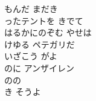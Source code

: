 \documentclass[10pt,b5j]{tarticle} %
\begin{document}
\begin{enumerate}
\begin{minipage}[c]{\blocksize}
        \vspace{\linespace}
        \item
        もんだ まだき\\
        ったテントを きでて\\
        はるかにのぞむ やせは\\
        けゆる ペテガリだ\\
        いざこう がよ\\
        のに アンザイレン\\
        のの\\
        き そうよ
    
    \end{minipage}
\end{enumerate} %
\end{document}
